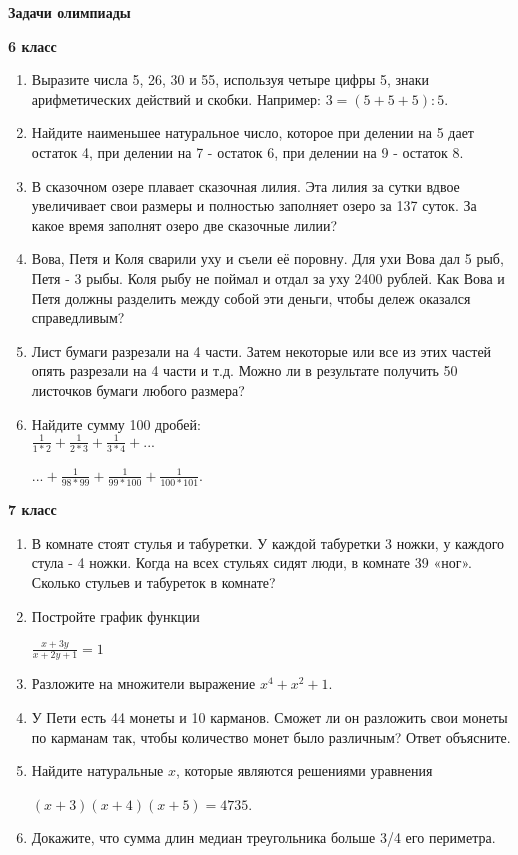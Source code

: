 \documentclass[a4paper,9pt]{article}
\begin{document}
\begin{center}
    {\LARGE \textbf{Задачи олимпиады}}
\end{center}

\begin{multicols}{3}

\textbf{6 класс}

\begin{enumerate}
    \item Выразите числа 5, 26, 30 и 55, используя четыре цифры 5, знаки арифметических действий и скобки. Например: \(3=(5+5+5):5\).
    \item Найдите наименьшее натуральное число, которое при делении на 5 дает остаток 4, при делении на 7 - остаток 6, при делении на 9 - остаток 8.
    \item В сказочном озере плавает сказочная лилия. Эта лилия за сутки вдвое увеличивает свои размеры и полностью заполняет озеро за 137 суток. За какое время заполнят озеро две сказочные лилии?
    \item Вова, Петя и Коля сварили уху и съели её поровну. Для ухи Вова дал 5 рыб, Петя - 3 рыбы. Коля рыбу не поймал и отдал за уху 2400 рублей. Как Вова и Петя должны разделить между собой эти деньги, чтобы дележ оказался справедливым?
    \item Лист бумаги разрезали на 4 части. Затем некоторые или все из этих частей опять разрезали на 4 части и т.д. Можно ли в результате получить 50 листочков бумаги любого размера?
    \item Найдите сумму 100 дробей: \\[0.5em]
    \(\frac{1}{1*2}+\frac{1}{2*3}+\frac{1}{3*4}+...\)
    \begin{center}
        \(...+\frac{1}{98*99}+\frac{1}{99*100}+\frac{1}{100*101}\).
    \end{center}
\end{enumerate}

\textbf{7 класс}

\begin{enumerate}
    \item В комнате стоят стулья и табуретки. У каждой табуретки 3 ножки, у каждого стула - 4 ножки. Когда на всех стульях сидят люди, в комнате 39 «ног». Сколько стульев и табуреток в комнате?
    \item Постройте график функции
    \begin{center}
        \(\frac{x+3y}{x+2y+1}=1\)
    \end{center}
    \item Разложите на множители выражение \(x^4+x^2+1\).
    \item У Пети есть 44 монеты и 10 карманов. Сможет ли он разложить свои монеты по карманам так, чтобы количество монет было различным? Ответ объясните.
    \item Найдите натуральные \(x\), которые являются решениями уравнения
    \begin{center}
        \((x+3)(x+4)(x+5)=4735\).
    \end{center}
    \item Докажите, что сумма длин медиан треугольника больше 3/4 его периметра.
\end{enumerate}


\end{multicols}
\end{document}
